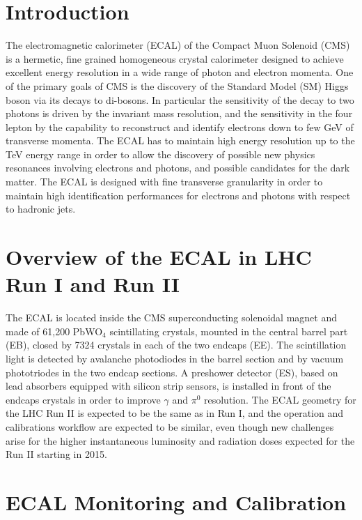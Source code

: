 \documentclass[11pt]{article}
\begin{document}
\begin{multicols}{2}

\section{Introduction}

The electromagnetic calorimeter (ECAL) of the Compact Muon Solenoid
(CMS) is a hermetic, fine grained homogeneous crystal calorimeter
designed to achieve excellent energy resolution in a wide range of
photon and electron momenta. One of the primary goals of CMS is the
discovery of the Standard Model (SM) Higgs boson via its decays to
di-bosons.  In particular the sensitivity of the decay to two photons
is driven by the invariant mass resolution, and the sensitivity in the
four lepton by the capability to reconstruct and identify electrons
down to few GeV of transverse momenta.  The ECAL has to maintain high
energy resolution up to the TeV energy range in order to allow the
discovery of possible new physics resonances involving electrons and
photons, and possible candidates for the dark matter.  The ECAL is
designed with fine transverse granularity in order to maintain high
identification performances for electrons and photons with respect to
hadronic jets.

\section{Overview of the ECAL in LHC Run I and Run II}
The ECAL is located inside the CMS superconducting solenoidal magnet
and made of 61,200 PbWO$_4$ scintillating crystals, mounted in the
central barrel part (EB), closed by 7324 crystals in each of the two
endcaps (EE). The scintillation light is detected by avalanche
photodiodes in the barrel section and by vacuum phototriodes in the
two endcap sections. A preshower detector (ES), based on lead
absorbers equipped with silicon strip sensors, is installed in front
of the endcaps crystals in order to improve $\gamma$ and $\pi^0$
resolution. The ECAL geometry for the LHC Run II is expected to be the
same as in Run I, and the operation and calibrations workflow are
expected to be similar, even though new challenges arise for the
higher instantaneous luminosity and radiation doses expected for the
Run II starting in 2015.

\section{ECAL Monitoring and Calibration}



\end{multicols}
\end{document}
